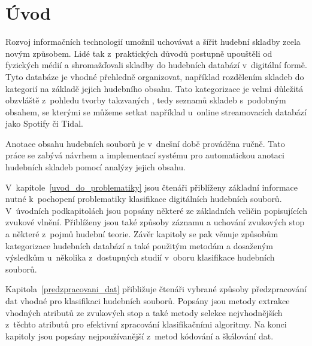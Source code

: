 

\chapter{Úvod}
\label{uvod}
Rozvoj informačních technologií umožnil uchovávat a šířit hudební skladby zcela novým způsobem. Lidé tak z~praktických důvodů postupně upouštěli od fyzických médií a shromažďovali skladby do hudebních databází v~digitální formě. Tyto databáze je vhodné přehledně organizovat, například rozdělením skladeb do kategorií na základě jejich hudebního obsahu. Tato kategorizace je velmi důležitá obzvláště z~pohledu tvorby takzvaných , tedy seznamů skladeb s~podobným obsahem, se kterými se můžeme setkat například u~online streamovacích databází jako Spotify či Tidal.

Anotace obsahu hudebních souborů je v~dnešní době prováděna ručně. Tato práce se zabývá návrhem a implementací systému pro automatickou anotaci hudebních skladeb pomocí analýzy jejich obsahu.

V~kapitole~\ref{uvod_do_problematiky} jsou čtenáři přiblíženy základní informace nutné k~pochopení problematiky klasifikace digitálních hudebních souborů. V~úvodních podkapitolách jsou popsány některé ze základních veličin popisujících zvukové vlnění. Přiblíženy jsou také způsoby záznamu a uchování zvukových stop a některé z~pojmů hudební teorie. Závěr kapitoly se pak věnuje způsobům kategorizace hudebních databází a také použitým metodám a dosaženým výsledkům u~několika z~dostupných studií v~oboru klasifikace hudebních souborů.

Kapitola~\ref{predzpracovani_dat} přibližuje čtenáři vybrané způsoby předzpracování dat vhodné pro klasifikaci hudebních souborů. Popsány jsou metody extrakce vhodných atributů ze zvukových stop a také metody selekce nejvhodnějších z~těchto atributů pro efektivní zpracování klasifikačními algoritmy. Na konci kapitoly jsou popsány nejpoužívanější z~metod kódování a škálování dat.

